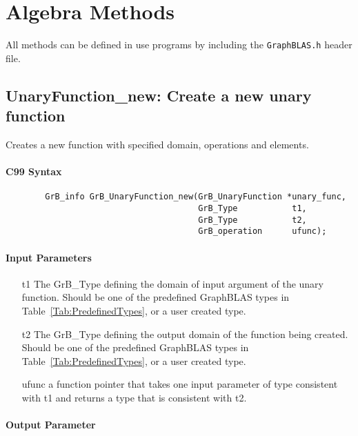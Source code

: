 \section{Algebra Methods}

All methods can be defined in use programs by including the {\tt GraphBLAS.h} header file.


\subsection{{\sf UnaryFunction\_new}: Create a new unary function}

Creates a new function with specified domain, operations and elements.

\paragraph{C99 Syntax}

\begin{verbatim}
        GrB_info GrB_UnaryFunction_new(GrB_UnaryFunction *unary_func,
                                       GrB_Type           t1,
                                       GrB_Type           t2,
                                       GrB_operation      ufunc);
\end{verbatim}

\paragraph{Input Parameters}

\begin{itemize}[leftmargin=1.1in]
    \item[{\sf t1}] The {\sf GrB\_Type} defining the domain of input argument of
    the unary function. Should be one of the predefined
    GraphBLAS types in Table~\ref{Tab:PredefinedTypes}, or a user created type.
    \item[{\sf t2}] The {\sf GrB\_Type} defining the output domain of the function
    being created.  Should be one of the predefined
    GraphBLAS types in Table~\ref{Tab:PredefinedTypes}, or a user created type.
    \item[{\sf ufunc}] a function pointer that takes one input parameter of type consistent
    with t1 and returns a type that is consistent with t2.
\end{itemize}

\paragraph{Output Parameter}

